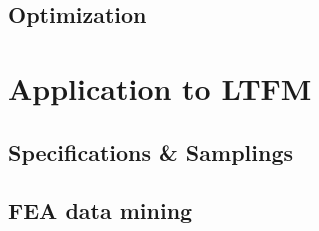         
        \subsection{Optimization}                   \label{Chapter:RSM/LFSM/Optimization}
    
    
    \section{Application to \ac{LTFM}}               \label{Chapter:RSM/LTFM}
    
        
        \subsection{Specifications \& Samplings}    \label{Chapter:RSM/LTFM/spec}
        
        
        \subsection{\acs{FEA} data mining}          \label{Chapter:RSM/LTFM/data mining}
        
        
